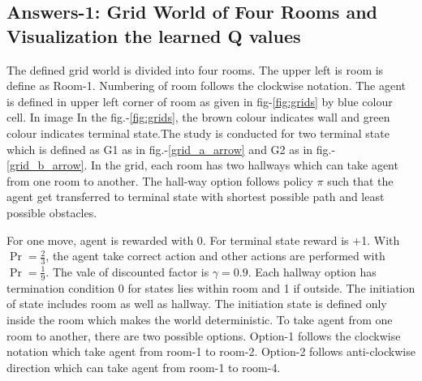 \documentclass[preprint,12pt]{elsarticle}
\begin{document}
\subsection{Answers-1: Grid World of Four Rooms and Visualization the learned Q values}




The defined grid world is divided into four rooms. The upper left is room is define as Room-1. Numbering of room follows the clockwise notation. The agent is defined in upper left corner of room as given in fig-\ref{fig:grids} by blue colour cell. In image  In the fig.-\ref{fig:grids}, the brown colour indicates wall and green colour indicates terminal state.The study is conducted for two terminal state which is defined as G1 as in fig.-\ref{grid_a_arrow} and G2 as in fig.-\ref{grid_b_arrow}. In the grid, each room has two hallways which can take agent from one room to another. The hall-way option follows policy $\pi$ such that the agent get transferred to terminal state with shortest possible path and least possible obstacles. 

For one move, agent is rewarded with 0. For terminal state reward is +1. With $\Pr = \frac{2}{3}$, the agent take correct action and other actions are performed with $\Pr = \frac{1}{9}$. The vale of discounted factor is $\gamma=0.9$. Each hallway option has termination condition 0 for states lies within room and 1 if outside. The initiation of state includes room as well as hallway. The initiation state is defined only inside the room which makes the world deterministic. To take agent from one room to another, there are two possible options. Option-1 follows the clockwise notation which take agent from room-1 to room-2. Option-2 follows anti-clockwise direction which can take agent from room-1 to room-4.
\end{document}
